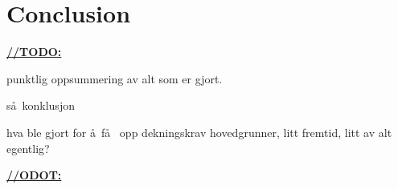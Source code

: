 \chapter{Conclusion}

\underline{\textbf{\LARGE //TODO:}}

punktlig oppsummering av alt som er gjort.

s\aa~konklusjon

hva ble gjort for \aa ~f\aa~ opp dekningskrav hovedgrunner, litt fremtid, litt av alt egentlig?

\underline{\textbf{\LARGE //ODOT:}}